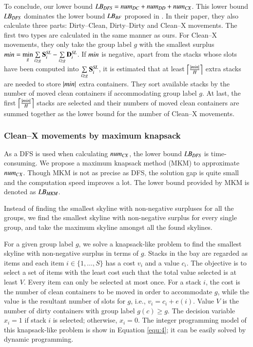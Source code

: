 \documentclass[review,3p,times,authoryear,12pt]{elsarticle}
\begin{document}
To conclude, our lower bound $\id{LB}_\id{DFS}=\id{num}_\id{DC}+\id{num}_\id{DD}+\id{num}_\id{CX}$. This lower bound $\id{LB}_\id{DFS}$ dominates the lower bound $\id{LB}_\id{BF}$ proposed in \cite{BF2012}. In their paper, they also calculate three parts: Dirty--Clean, Dirty--Dirty and Clean--X movements.
The first two types are calculated in the same manner as ours. For Clean--X movements, they only take the group label $g$ with the smallest surplus $\id{min}=\min\limits_g\sum\limits_{i\ge g}\mathbf S^\id{SL}_i-\sum\limits_{i\ge g}\mathbf D^\id{SL}_i$.
If $\id{min}$ is negative, apart from the stacks whose slots have been computed into $\sum\limits_{i\ge g}\mathbf S^\id{SL}_i$, it is estimated that at least $\left\lceil\frac{|\id{min}|}{H}\right\rceil$ extra stacks are needed to store $|\id{min}|$ extra containers. They sort available stacks by the number of moved clean containers if accommodating group label $g$. At last, the first $\left\lceil\frac{|\id{min}|}{H}\right\rceil$ stacks are selected and their numbers of moved clean containers are summed together as the lower bound for the number of Clean--X movements.

\subsubsection{Clean--X movements by maximum knapsack}

As a DFS is used when calculating $\id{num}_{\id{CX}}$, the lower bound $\id{LB}_\id{DFS}$ is time-consuming. We propose a maximum knapsack method (MKM) to approximate $\id{num}_{CX}$. Though MKM is not as precise as DFS, the solution gap is quite small and the computation speed improves a lot. The lower bound provided by MKM is denoted as $\id{LB}_{\id{MKM}}$.

Instead of finding the smallest skyline with non-negative surpluses for all the groups, we find the smallest skyline with non-negative surplus for every single group, and take the maximum skyline amongst all the found skylines.

For a given group label $g$, we solve a knapsack-like problem to find the smallest skyline with non-negative surplus in terms of $g$. Stacks in the bay are regarded as items and each item $i\in\{1,\dots,S\}$ has a cost $v_i$ and a value $c_i$. The objective is to select a set of items with the least cost such that the total value selected is at least $V$. Every item can only be selected at most once. For a stack $i$, the cost is the number of clean containers to be moved in order to accommodate $g$, while the value is the resultant number of slots for $g$, i.e., $v_i=c_i+e(i)$. Value $V$ is the number of dirty containers with group label $g(c)\ge g$. The decision variable $x_i=1$ if stack $i$ is selected; otherwise, $x_i=0$. The integer programming model of this knapsack-like problem is show in Equation \ref{equ:4}; it can be easily solved by dynamic programming.
\end{document}
